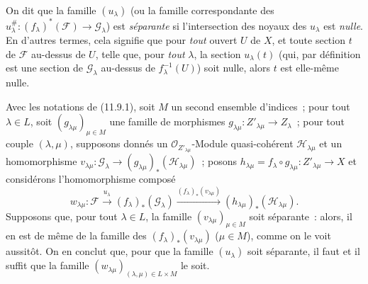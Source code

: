 
On dit que la famille $(u_\lambda)$ (ou la famille correspondante des
$u^\#_\lambda:(f_\lambda)^*(\mathcal F)\to\mathcal G_\lambda$) est
\emph{séparante} si l'intersection des noyaux des $u_\lambda$ est
\emph{nulle}. En d'autres termes, cela signifie que pour \emph{tout} ouvert
$U$ de $X$, et toute section $t$ de $\mathcal F$ au-dessus de $U$, telle que,
pour \emph{tout} $\lambda$, la section $u_\lambda(t)$ (qui, par définition est
une section de $\mathcal G_\lambda$ au-dessus de $f_\lambda^{-1}(U)$) soit
nulle, alors $t$ est elle-même nulle.

\begin{env}[11.9.2]
\label{IV.11.9.2-fr}
Avec les notations de (11.9.1), soit $M$ un second ensemble d'indices~; pour
tout $\lambda\in L$, soit $(g_{\lambda\mu})_{\mu\in M}$ une famille de
morphismes $g_{\lambda\mu}:Z'_{\lambda\mu}\to Z_\lambda$~; pour tout couple
$(\lambda,\mu)$, supposons donnés un $\mathcal O_{Z'_{\lambda\mu}}$-Module
quasi-cohérent $\mathcal H_{\lambda\mu}$ et un homomorphisme
$v_{\lambda\mu}:\mathcal G_\lambda\to
(g_{\lambda\mu})_*(\mathcal H_{\lambda\mu})$~; posons
$h_{\lambda\mu}=f_\lambda\circ g_{\lambda\mu}:Z'_{\lambda\mu}\to X$ et
considérons l'homomorphisme composé
\[
w_{\lambda\mu}:\mathcal F\xrightarrow{u_\lambda}
(f_\lambda)_*(\mathcal G_\lambda)
\xrightarrow{(f_\lambda)_*(v_{\lambda\mu})}
(h_{\lambda\mu})_*(\mathcal H_{\lambda\mu}).
\]
Supposons que, pour tout $\lambda\in L$, la famille
$(v_{\lambda\mu})_{\mu\in M}$ soit séparante~: alors, il en est de même de la
famille des $(f_\lambda)_*(v_{\lambda\mu})$ ($\mu\in M$), comme on le voit
aussitôt. On en conclut que, pour que la famille $(u_\lambda)$ soit séparante,
il faut et il suffit que la famille
$(w_{\lambda\mu})_{(\lambda,\mu)\in L\times M}$ le soit.
\end{env}

